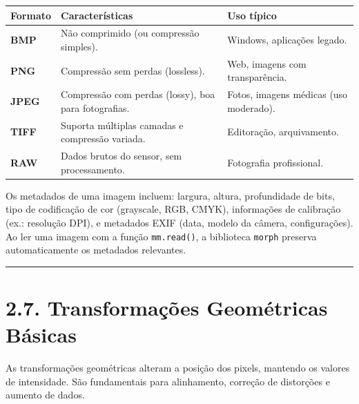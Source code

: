 \documentclass[
  portuguese,
  letterpaper,
  openany,
  oneside,
  12pt,
  a4paper]{book}
\begin{document}
\begin{tcolorbox}
\begin{longtable}[]{@{}
  >{\raggedright\arraybackslash}p{}
  >{\raggedright\arraybackslash}p{}
  >{\raggedright\arraybackslash}p{}@{}}
\toprule\noalign{}
\begin{minipage}[b]{\linewidth}\raggedright
Formato
\end{minipage} & \begin{minipage}[b]{\linewidth}\raggedright
Características
\end{minipage} & \begin{minipage}[b]{\linewidth}\raggedright
Uso típico
\end{minipage} \\
\midrule\noalign{}
\endhead
\bottomrule\noalign{}
\endlastfoot
\textbf{BMP} & Não comprimido (ou compressão simples). & Windows,
aplicações legado. \\
\textbf{PNG} & Compressão sem perdas (lossless). & Web, imagens com
transparência. \\
\textbf{JPEG} & Compressão com perdas (lossy), boa para fotografias. &
Fotos, imagens médicas (uso moderado). \\
\textbf{TIFF} & Suporta múltiplas camadas e compressão variada. &
Editoração, arquivamento. \\
\textbf{RAW} & Dados brutos do sensor, sem processamento. & Fotografia
profissional. \\
\end{longtable}

Os metadados de uma imagem incluem: largura, altura, profundidade de
bits, tipo de codificação de cor (grayscale, RGB, CMYK), informações de
calibração (ex.: resolução DPI), e metadados EXIF (data, modelo da
câmera, configurações). Ao ler uma imagem com a função
\texttt{mm.read()}, a biblioteca \texttt{morph} preserva automaticamente
os metadados relevantes.

\begin{center}\rule{0.5\linewidth}{0.5pt}\end{center}

\section{2.7. Transformações Geométricas
Básicas}\label{transformauxe7uxf5es-geomuxe9tricas-buxe1sicas}

As transformações geométricas alteram a posição dos pixels, mantendo os
valores de intensidade. São fundamentais para alinhamento, correção de
distorções e aumento de dados.


\end{tcolorbox}
\end{document}
